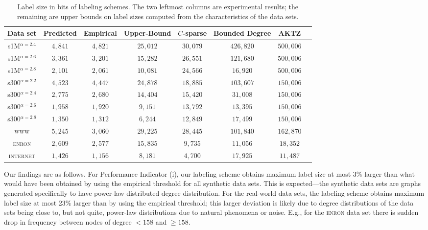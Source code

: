 \begin{table}
\small
\begin{tabular}{cccccccc}
Data set&Predicted &Empirical & Upper-Bound     &$C$-sparse &Bounded Degree \cite{adjiashvili2014labeling} &AKTZ \cite{alstrup2014adjacency}\\\hline
s1M$^{\alpha=2.4}$  &$4,841$    &$4,821$    & $25,012 $ &$30,079$     &$426,820$ &$500,006$\\\hline
s1M$^{\alpha=2.6}$  &$3,361$    &$3,201$    & $15,282 $ &$26,551$     &$121,680$ &$500,006$\\\hline
s1M$^{\alpha=2.8}$  &$2,101$    &$2,061$    & $10,081 $ &$24,566$     &$16,920$  &$500,006$\\\hline
s300$^{\alpha=2.2}$ &$4,523$    &$4,447$    & $24,878 $ &$18,885$     &$103,607$ &$150,006$\\\hline
s300$^{\alpha=2.4}$ &$2,775$    &$2,680$    & $14,404 $ &$15,420$     &$31,008$  &$150,006$\\\hline
s300$^{\alpha=2.6}$ &$1,958$    &$1,920$    & $9,151 $  &$13,792$     &$13,395$  &$150,006$\\\hline
s300$^{\alpha=2.8}$ &$1,350$    &$1,312$    & $6,244 $  &$12,849$     &$17,499$  &$150,006$\\\hline
\textsc{www}        &$5,245$    &$3,060$    & $29,225 $ &$28,445$     &$101,840$ &$162,870$ \\\hline
\textsc{enron}      &$2,609$    &$2,577$    & $15,835 $ &$9,735$      &$11,056$  &$18,352$\\\hline
\textsc{internet}   &$1,426$    &$1,156$    & $8,181 $  &$4,700$      &$17,925$  &$11,487$\\\hline 
\end{tabular}
\caption{Label size in bits of labeling schemes. The two leftmost columns are experimental results; the remaining are upper bounds on label sizes computed from the characteristics of the data sets.}
\label{t:labelsizes}
\end{table}

Our findings are as follows. For Performance Indicator (i), our labeling scheme obtains maximum label size at most 3\% larger than what would have been obtained by using the empirical threshold for all synthetic data sets.
This is expected---the synthetic data sets are graphs generated specifically to have power-law distributed degree distribution. For the real-world data sets, the labeling scheme
obtains maximum label size at most 23\% larger than by using the empirical threshold; this larger deviation is likely due to degree distributions of the data sets being close to, but not quite,
power-law distributions due to natural phenomena or noise. E.g., for the \textsc{enron} data set there is sudden drop in frequency between nodes of degree $< 158$ and $\geq 158$.

